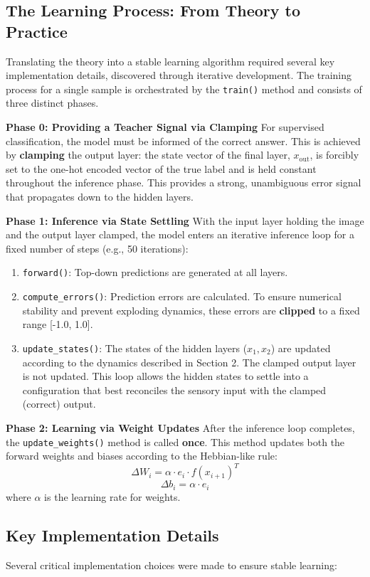 \documentclass[a4paper,12pt]{article}
\begin{document}
\subsection{The Learning Process: From Theory to Practice}
Translating the theory into a stable learning algorithm required several key implementation details, discovered through iterative development. The training process for a single sample is orchestrated by the \texttt{train()} method and consists of three distinct phases.

\textbf{Phase 0: Providing a Teacher Signal via Clamping}
For supervised classification, the model must be informed of the correct answer. This is achieved by \textbf{clamping} the output layer: the state vector of the final layer, $x_{\text{out}}$, is forcibly set to the one-hot encoded vector of the true label and is held constant throughout the inference phase. This provides a strong, unambiguous error signal that propagates down to the hidden layers.

\textbf{Phase 1: Inference via State Settling}
With the input layer holding the image and the output layer clamped, the model enters an iterative inference loop for a fixed number of steps (e.g., 50 iterations):
\begin{enumerate}
    \item \texttt{forward()}: Top-down predictions are generated at all layers.
    \item \texttt{compute\_errors()}: Prediction errors are calculated. To ensure numerical stability and prevent exploding dynamics, these errors are \textbf{clipped} to a fixed range [-1.0, 1.0].
    \item \texttt{update\_states()}: The states of the hidden layers ($x_1, x_2$) are updated according to the dynamics described in Section 2. The clamped output layer is not updated. This loop allows the hidden states to settle into a configuration that best reconciles the sensory input with the clamped (correct) output.
\end{enumerate}

\textbf{Phase 2: Learning via Weight Updates}
After the inference loop completes, the \texttt{update\_weights()} method is called \textbf{once}. This method updates both the forward weights and biases according to the Hebbian-like rule:
\[ \Delta W_i = \alpha \cdot e_i \cdot f(x_{i+1})^T \]
\[ \Delta b_i = \alpha \cdot e_i \]
where $\alpha$ is the learning rate for weights.

\subsection{Key Implementation Details}
Several critical implementation choices were made to ensure stable learning:
\end{document}

